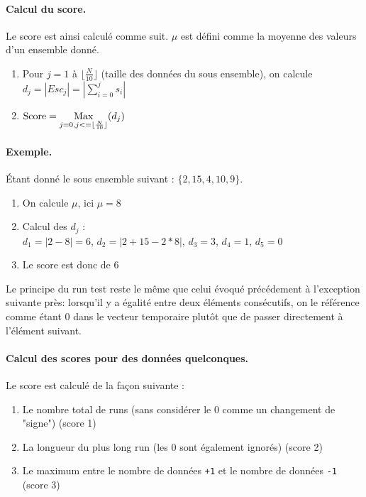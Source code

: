 \paragraph{Calcul du score.\\}
Le score est ainsi calculé comme suit. $\mu$ est défini comme la moyenne des valeurs d'un ensemble donné.
\begin{enumerate}
\item Pour $j=1$ à $ \lfloor\frac{N}{10}\rfloor$ (taille des données du sous ensemble), on calcule $d_j=|Esc_j| = |\sum\limits_{i=0}^{j} s_i|$
\item $\text{Score} = \operatorname*{Max}\limits_{j=0,j<=\lfloor\frac{N}{10}\rfloor} (d_j)$
\end{enumerate}

\paragraph{Exemple.\\}
Étant donné le sous ensemble suivant : $ \lbrace 2, 15, 4, 10, 9 \rbrace$. 
\begin{enumerate}
\item On calcule $\mu$, ici $\mu=8$
\item Calcul des $d_j$ :\\
$d_1=|2-8|=6$, $d_2=|2+15-2*8|$, $d_3=3$, $d_4=1$, $d_5=0$
\item Le score est donc de $6$\\
\end{enumerate}

Le principe du run test reste le même que celui évoqué précédement à l'exception suivante près:  lorsqu'il y a égalité entre deux éléments consécutifs, on le référence comme étant 0 dans le vecteur temporaire plutôt que de passer directement à l'élément suivant. 

\paragraph{Calcul des scores pour des données quelconques.\\}
Le score est calculé de la façon suivante : 
\begin{enumerate}
\item Le nombre total de runs (sans considérer le 0 comme un changement de "signe") (score 1)
\item La longueur du plus long run (les 0 sont également ignorés)  (score 2)
\item Le maximum entre le nombre de données \texttt{+1} et le nombre de données \texttt{-1} (score 3)\\

\end{enumerate}


